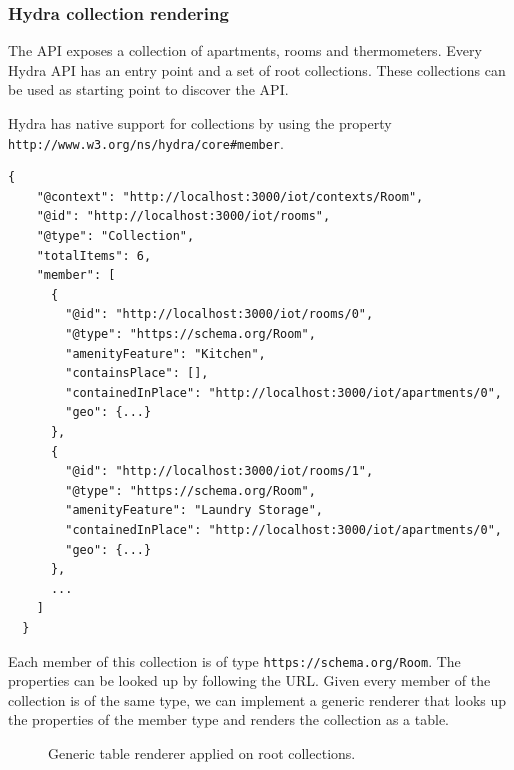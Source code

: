 \subsubsection{Hydra collection rendering}
The API exposes a collection of apartments, rooms and thermometers. Every Hydra API has an entry point and a set of root collections. These collections can be used as starting point to discover the API.

Hydra has native support for collections by using the property \lstinline{http://www.w3.org/ns/hydra/core#member}.

\lstset{language=JSON}
\begin{lstlisting}[caption=Data of /rooms as Hydra collection.]
  {
    "@context": "http://localhost:3000/iot/contexts/Room",
    "@id": "http://localhost:3000/iot/rooms",
    "@type": "Collection",
    "totalItems": 6,
    "member": [
      {
        "@id": "http://localhost:3000/iot/rooms/0",
        "@type": "https://schema.org/Room",
        "amenityFeature": "Kitchen",
        "containsPlace": [],
        "containedInPlace": "http://localhost:3000/iot/apartments/0",
        "geo": {...}
      },
      {
        "@id": "http://localhost:3000/iot/rooms/1",
        "@type": "https://schema.org/Room",
        "amenityFeature": "Laundry Storage",
        "containedInPlace": "http://localhost:3000/iot/apartments/0",
        "geo": {...}
      },
      ...
    ]
  }
\end{lstlisting}

Each member of this collection is of type \lstinline{https://schema.org/Room}. The properties can be looked up by following the URL. Given every member of the collection is of the same type, we can implement a generic renderer that looks up the properties of the member type and renders the collection as a table.

\begin{figure}[!htb]
  \caption{Generic table renderer applied on root collections.}
\end{figure}

